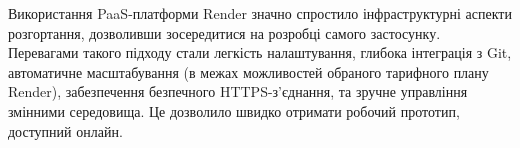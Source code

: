 Використання PaaS-платформи Render значно спростило інфраструктурні аспекти розгортання, дозволивши зосередитися на розробці самого застосунку. Перевагами такого підходу стали легкість налаштування, глибока інтеграція з Git, автоматичне масштабування (в межах можливостей обраного тарифного плану Render), забезпечення безпечного HTTPS-з'єднання, та зручне управління змінними середовища. Це дозволило швидко отримати робочий прототип, доступний онлайн.


